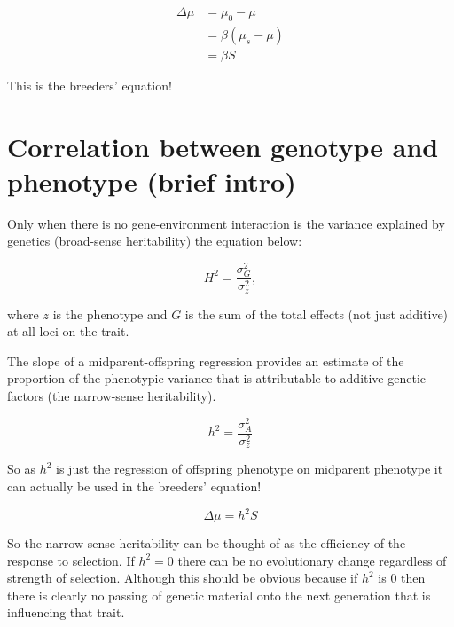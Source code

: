 \documentclass[
]{book}
\begin{document}
\begin{equation}
\begin{split}
  \Delta\mu &= \mu_0 - \mu \\
  &= \beta(\mu_s - \mu) \\
  &= \beta{S}
\end{split}
\label{eq:breeders-equation}
\end{equation}

This is the breeders' equation!

\hypertarget{correlation-between-genotype-and-phenotype-brief-intro}{%
\section{Correlation between genotype and phenotype (brief intro)}\label{correlation-between-genotype-and-phenotype-brief-intro}}

Only when there is no gene-environment interaction is the variance explained by genetics (broad-sense heritability) the equation below:

\begin{equation}
  H^2 = \frac{\sigma^2_G} {\sigma^2_z},
  \label{eq:broad-sense-heritability}
\end{equation}

where \(z\) is the phenotype and \(G\) is the sum of the total effects (not just additive) at all loci on the trait.

The slope of a midparent-offspring regression provides an estimate of the proportion of the phenotypic variance that is attributable to additive genetic factors (the narrow-sense heritability).

\begin{equation}
  h^2 = \frac{\sigma^2_A} {\sigma^2_z}
  \label{eq:narrow-sense-heritability}
\end{equation}

So as \(h^2\) is just the regression of offspring phenotype on midparent phenotype it can actually be used in the breeders' equation!

\begin{equation}
  \Delta\mu = h^2S
  \label{eq:breeders-equation-with-h2}
\end{equation}

So the narrow-sense heritability can be thought of as the efficiency of the response to selection. If \(h^2 = 0\) there can be no evolutionary change regardless of strength of selection. Although this should be obvious because if \(h^2\) is 0 then there is clearly no passing of genetic material onto the next generation that is influencing that trait.
\end{document}
